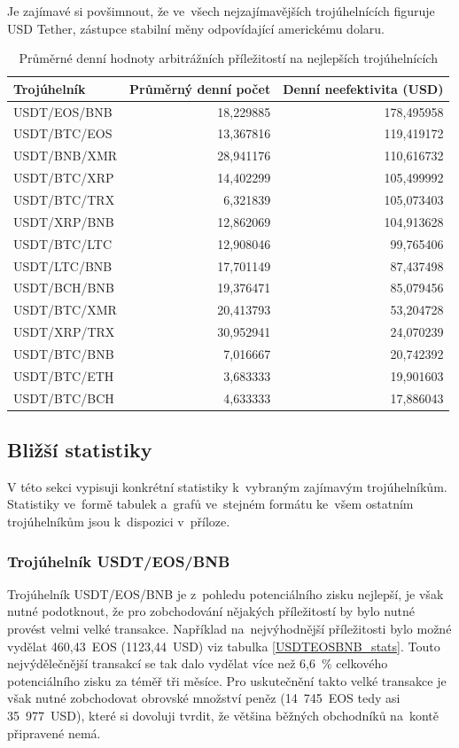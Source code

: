 \documentclass[thesis=B,czech]{FITthesis}[2019/03/21]
\begin{document}
Je zajímavé si povšimnout, že ve~všech nejzajímavějších trojúhelnících figuruje USD Tether, zástupce stabilní měny odpovídající americkému dolaru.


\begin{table}\centering
\caption{Průměrné denní hodnoty arbitrážních příležitostí na nejlepších trojúhelnících}
\label{table_combined_best}
\begin{tabular}{|| l | r | r ||}\hline Trojúhelník & Průměrný denní počet & Denní neefektivita (USD)\\
 \hline
 \hline USDT/EOS/BNB & 18,229885 & 178,495958\\ 
 \hline USDT/BTC/EOS & 13,367816 & 119,419172\\ 
 \hline USDT/BNB/XMR & 28,941176 & 110,616732\\ 
 \hline USDT/BTC/XRP & 14,402299 & 105,499992\\ 
 \hline USDT/BTC/TRX & 6,321839 & 105,073403\\ 
 \hline USDT/XRP/BNB & 12,862069 & 104,913628\\ 
 \hline USDT/BTC/LTC & 12,908046 & 99,765406\\ 
 \hline USDT/LTC/BNB & 17,701149 & 87,437498\\ 
 \hline USDT/BCH/BNB & 19,376471 & 85,079456\\ 
 \hline USDT/BTC/XMR & 20,413793 & 53,204728\\ 
 \hline USDT/XRP/TRX & 30,952941 & 24,070239\\ 
 \hline USDT/BTC/BNB & 7,016667 & 20,742392\\ 
 \hline USDT/BTC/ETH & 3,683333 & 19,901603\\ 
 \hline USDT/BTC/BCH & 4,633333 & 17,886043\\ 
 \hline
\end{tabular}
\end{table}

\subsection{Bližší statistiky}
V této sekci vypisuji konkrétní statistiky k~vybraným zajímavým trojúhelníkům. Statistiky ve~formě tabulek a~grafů ve~stejném formátu ke~všem ostatním trojúhelníkům jsou k~dispozici v~příloze.

\subsubsection{Trojúhelník USDT/EOS/BNB}
Trojúhelník USDT/EOS/BNB je z~pohledu potenciálního zisku nejlepší, je však nutné podotknout, že pro zobchodování nějakých příležitostí by bylo nutné provést velmi velké transakce. Například na~nejvýhodnější příležitosti bylo možné vydělat 460,43~EOS (1123,44~USD) viz tabulka \ref{USDTEOSBNB_stats}. Touto nejvýdělečnější transakcí se tak dalo vydělat více než 6,6~\% celkového potenciálního zisku za téměř tři měsíce. Pro uskutečnění takto velké transakce je však nutné zobchodovat obrovské množství peněz (14~745~EOS tedy asi 35~977~USD), které si dovoluji tvrdit, že většina běžných obchodníků na~kontě připravené nemá.
\end{document}
